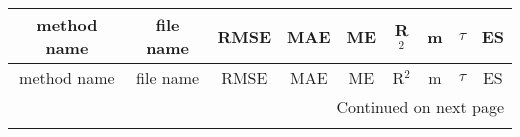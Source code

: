 \documentclass{article}
\begin{document}
\begin{center}
\scriptsize
\begin{longtable}{|ccccccccc|}
\toprule
                 method name &                                     file name &              RMSE &               MAE &                   ME &             R$^2$ &                    m &               $\tau$ &                   ES \\
\midrule
\endfirsthead

\toprule
                 method name &                                     file name &              RMSE &               MAE &                   ME &             R$^2$ &                    m &               $\tau$ &                   ES \\
\midrule
\endhead
\midrule
\multicolumn{9}{r}{{Continued on next page}} \\
\midrule
\endfoot


\end{longtable}
\end{center}
\end{document}
